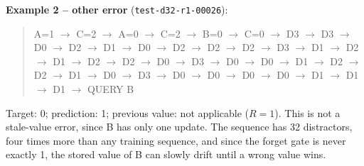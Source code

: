 \documentclass[12pt]{article}
\theoremstyle{definition}
\begin{document}
{\begin{enumerate}[label=\textbf{1.2.\arabic*}, leftmargin=*]
    \textbf{Example 2 -- other error} (\texttt{test-d32-r1-00026}):
    \begin{quote}\ttfamily\small
    A=1 $\to$ C=2 $\to$ A=0 $\to$ C=2 $\to$ B=0 $\to$ C=0
    $\to$ D3 $\to$ D3 $\to$ D0 $\to$ D2 $\to$ D1 $\to$ D0
    $\to$ D2 $\to$ D2 $\to$ D2 $\to$ D3 $\to$ D1 $\to$ D2
    $\to$ D1 $\to$ D2 $\to$ D2 $\to$ D0 $\to$ D3 $\to$ D0
    $\to$ D0 $\to$ D1 $\to$ D2 $\to$ D2 $\to$ D1 $\to$ D0
    $\to$ D3 $\to$ D0 $\to$ D0 $\to$ D0 $\to$ D0 $\to$ D1
    $\to$ D1 $\to$ D1 $\to$ QUERY B
    \end{quote}
    Target: 0; prediction: 1; previous value: not applicable ($R=1$).
    This is not a stale-value error, since B has only one update. The
    sequence has 32 distractors, four times more than any training sequence,
    and since the forget gate is never exactly 1, the stored value of B can
    slowly drift until a wrong value wins.
\end{enumerate}
}
\end{document}
